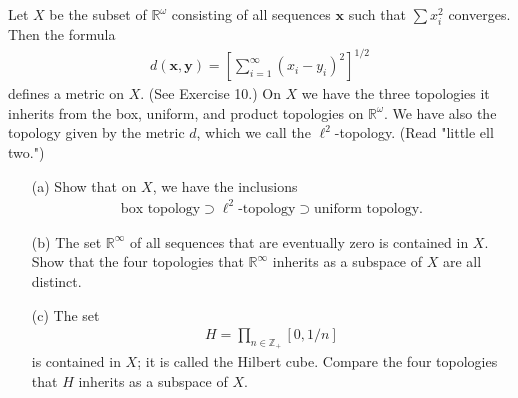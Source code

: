 \begin{exercise}[Munkres 20.8]
  Let $X$ be the subset of $\mathbb{R}^\omega$ consisting of all sequences $\mathbf{x}$ such that $\sum x_i^2$ converges. Then the formula
  \begin{align*}
    d(\mathbf{x}, \mathbf{y}) = \left[\sum_{i=1}^{\infty}(x_i - y_i)^2\right]^{1/2}
  \end{align*}
  defines a metric on $X$. (See Exercise 10.) On $X$ we have the three topologies it inherits from the box, uniform, and product topologies on $\mathbb{R}^\omega$. We have also the topology given by the metric $d$, which we call the $\ell^2$-topology. (Read "little ell two.")
  \begin{enumerate} 
    \item[(a)] Show that on $X$, we have the inclusions
    \begin{align*}
      \text{box topology} \supset \ell^2\text{-topology} \supset \text{uniform topology}.
    \end{align*}
    
    \item[(b)] The set $\mathbb{R}^\infty$ of all sequences that are eventually zero is contained in $X$. Show that the four topologies that $\mathbb{R}^\infty$ inherits as a subspace of $X$ are all distinct.
    
    \item[(c)] The set
    \begin{align*}
      H = \prod_{n\in\mathbb{Z}_+} [0, 1/n]
    \end{align*}
    is contained in $X$; it is called the Hilbert cube. Compare the four topologies that $H$ inherits as a subspace of $X$.
  \end{enumerate}
\end{exercise}

